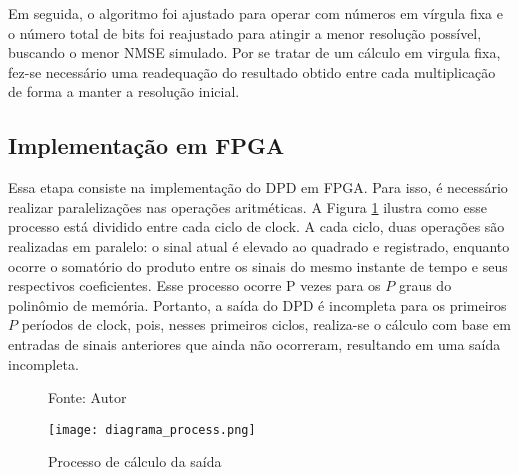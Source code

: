 Em seguida, o algoritmo foi ajustado para operar com números em vírgula fixa e o número total de bits foi reajustado para atingir a menor resolução possível, buscando o menor NMSE simulado. Por se tratar de um cálculo em virgula fixa, fez-se necessário uma readequação do resultado obtido entre cada multiplicação de forma a manter a resolução inicial.

\subsection{Implementação em FPGA}
Essa etapa consiste na implementação do DPD em FPGA. Para isso, é necessário realizar paralelizações nas operações aritméticas. A Figura \ref{fig:diagramaprocess} ilustra como esse processo está dividido entre cada ciclo de clock. A cada ciclo, duas operações são realizadas em paralelo: o sinal atual é elevado ao quadrado e registrado, enquanto ocorre o somatório do produto entre os sinais do mesmo instante de tempo e seus respectivos coeficientes. Esse processo ocorre P vezes para os \( P \) graus do polinômio de memória. Portanto, a saída do DPD é incompleta para os primeiros \( P \) períodos de clock, pois, nesses primeiros ciclos, realiza-se o cálculo com base em entradas de sinais anteriores que ainda não ocorreram, resultando em uma saída incompleta.

\begin{figure}[ht!]
  \centering
  \captionsetup{justification=centering}
  \caption*{Fonte: Autor}
  \texttt{[image: diagrama\_process.png]}
  \caption{Processo de cálculo da saída}
  \label{fig:diagramaprocess}
\end{figure}
  
